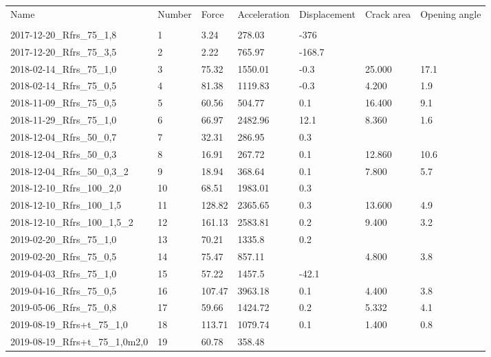 \begin{tabular}{l l l l l l l}
\toprule
Name & Number &   Force & Acceleration & Displacement & Crack area & Opening angle \\
&        &         &              &              &            &               \\
\midrule
2017-12-20\_Rfrs\_75\_1,8       &      1 &    3.24 &       278.03 &         -376 &            &               \\
2017-12-20\_Rfrs\_75\_3,5       &      2 &    2.22 &       765.97 &       -168.7 &            &               \\
2018-02-14\_Rfrs\_75\_1,0       &      3 &   75.32 &      1550.01 &         -0.3 &     25.000 &          17.1 \\
2018-02-14\_Rfrs\_75\_0,5       &      4 &   81.38 &      1119.83 &         -0.3 &      4.200 &           1.9 \\
2018-11-09\_Rfrs\_75\_0,5       &      5 &   60.56 &       504.77 &          0.1 &     16.400 &           9.1 \\
2018-11-29\_Rfrs\_75\_1,0       &      6 &   66.97 &      2482.96 &         12.1 &      8.360 &           1.6 \\
2018-12-04\_Rfrs\_50\_0,7       &      7 &   32.31 &       286.95 &          0.3 &            &               \\
2018-12-04\_Rfrs\_50\_0,3       &      8 &   16.91 &       267.72 &          0.1 &     12.860 &          10.6 \\
2018-12-04\_Rfrs\_50\_0,3\_2     &      9 &   18.94 &       368.64 &          0.1 &      7.800 &           5.7 \\
2018-12-10\_Rfrs\_100\_2,0      &     10 &   68.51 &      1983.01 &          0.3 &            &               \\
2018-12-10\_Rfrs\_100\_1,5      &     11 &  128.82 &      2365.65 &          0.3 &     13.600 &           4.9 \\
2018-12-10\_Rfrs\_100\_1,5\_2    &     12 &  161.13 &      2583.81 &          0.2 &      9.400 &           3.2 \\
2019-02-20\_Rfrs\_75\_1,0       &     13 &   70.21 &       1335.8 &          0.2 &            &               \\
2019-02-20\_Rfrs\_75\_0,5       &     14 &   75.47 &       857.11 &              &      4.800 &           3.8 \\
2019-04-03\_Rfrs\_75\_1,0       &     15 &   57.22 &       1457.5 &        -42.1 &            &               \\
2019-04-16\_Rfrs\_75\_0,5       &     16 &  107.47 &      3963.18 &          0.1 &      4.400 &           3.8 \\
2019-05-06\_Rfrs\_75\_0,8       &     17 &   59.66 &      1424.72 &          0.2 &      5.332 &           4.1 \\
2019-08-19\_Rfrs+t\_75\_1,0     &     18 &  113.71 &      1079.74 &          0.1 &      1.400 &           0.8 \\
2019-08-19\_Rfrs+t\_75\_1,0m2,0 &     19 &   60.78 &       358.48 &              &            &               \\
\bottomrule
\end{tabular}
